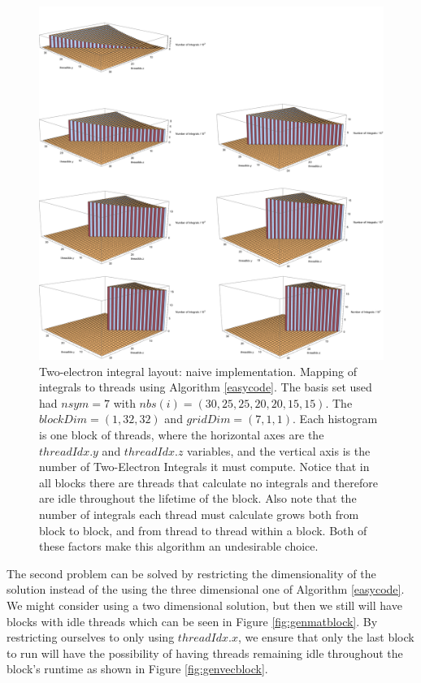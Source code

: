 \begin{figure}[h!]
\includegraphics[width=1\textwidth]{Figures/30_25_20_15_naive_layout.png}
\caption[Two-electron integral layout: naive implementation.]
{Two-electron integral layout: naive implementation. Mapping of integrals to threads using Algorithm \ref{easycode}. The basis set used had $nsym = 7$ with $nbs(i)=(30,25,25,20,20,15,15)$. The $blockDim = (1, 32, 32)$ and $gridDim = (7, 1, 1)$. Each histogram is one block of threads, where the horizontal axes are the $threadIdx.y$ and $threadIdx.z$ variables, and the vertical axis is the number of Two-Electron Integrals it must compute. Notice that in all blocks there are threads that calculate no integrals and therefore are idle throughout the lifetime of the block. Also note that the number of integrals each thread must calculate grows both from block to block, and from thread to thread within a block. Both of these factors make this algorithm an undesirable choice.}
\label{fig:naivelayout}
\end{figure}

The second problem can be solved by restricting the dimensionality of the solution instead of the using the three dimensional one of Algorithm \ref{easycode}. We might consider using a two dimensional solution, but then we still will have blocks with idle threads which can be seen in Figure \ref{fig:genmatblock}. By restricting ourselves to only using $threadIdx.x$, we ensure that only the last block to run will have the possibility of having threads remaining idle throughout the block's runtime as shown in Figure \ref{fig:genvecblock}. 

